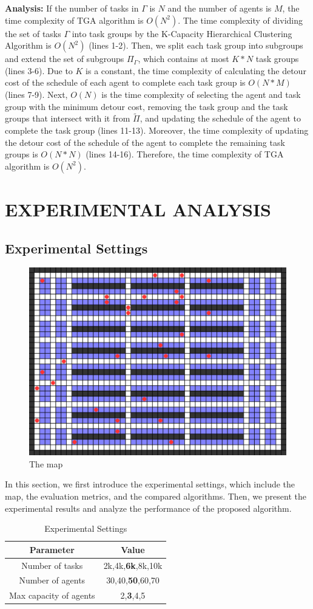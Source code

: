 \documentclass[sigconf,anonymous]{aamas}
\begin{document}
\textbf{Analysis:}
If the number of tasks in $\Gamma$ is $N$ and the number of agents is $M$,
the time complexity of TGA algorithm is $O(N^2)$.
The time complexity of dividing the set of tasks $\Gamma$ into task groups by the K-Capacity Hierarchical Clustering Algorithm is $O(N^2)$ (lines 1-2).
Then, we split each task group into subgroups and extend the set of subgroups $\Pi_{\Gamma}$,
which contains at most $K*N$ task groups (lines 3-6).
Due to $K$ is a constant,
the time complexity of calculating the detour cost of the schedule of each agent 
to complete each task group is $O(N*M)$ (lines 7-9).
Next, $O(N)$ is the time complexity of selecting the agent and task group with the minimum detour cost,
removing the task group and the task groups that intersect with it from $\tilde{\Pi}$,
and updating the schedule of the agent to complete the task group (lines 11-13).
Moreover, the time complexity of updating the detour cost of the schedule of the agent to complete the remaining task groups is $O(N*N)$ (lines 14-16).
Therefore, the time complexity of TGA algorithm is $O(N^2)$.


\section{EXPERIMENTAL ANALYSIS}
\label{sec:experiment}
\subsection{Experimental Settings}
\begin{figure}[htbp]
  \centering
  \includegraphics[width=0.5\linewidth]{Fig/map.png}
  \caption{The map}
  \label{fig:map}
\end{figure}
In this section, we first introduce the experimental settings,
which include the map, the evaluation metrics, and the compared algorithms.
Then, we present the experimental results and analyze the performance of the proposed algorithm.

\begin{table}[htbp]
  \centering
  \caption{Experimental Settings}
  \label{tab:settings}
  \begin{tabular}{c|c}
    \toprule
    Parameter & Value \\
    \midrule
    Number of tasks & 2k,4k,\textbf{6k},8k,10k\\
    Number of agents & 30,40,\textbf{50},60,70 \\
    Max capacity of agents & 2,\textbf{3},4,5 \\

    \bottomrule
  \end{tabular}
\end{table}
\end{document}
